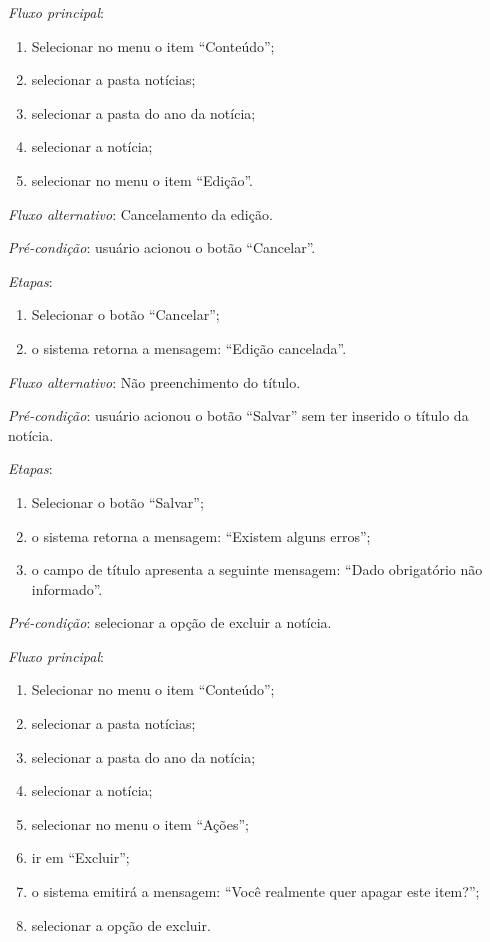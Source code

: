 \noindent \textit{Fluxo principal}:

\begin{enumerate}
    \item Selecionar no menu o item ``Conteúdo'';
    \item selecionar a pasta notícias;
    \item selecionar a pasta do ano da notícia;
    \item selecionar a notícia;
    \item selecionar no menu o item ``Edição''.
\end{enumerate}

\noindent \textit{Fluxo alternativo}: Cancelamento da edição.

\noindent \textit{Pré-condição}: usuário acionou o botão ``Cancelar''.

\noindent \textit{Etapas}:

\begin{enumerate}
    \item Selecionar o botão ``Cancelar'';
    \item o sistema retorna a mensagem: ``Edição cancelada''.
\end{enumerate}

\noindent \textit{Fluxo alternativo}: Não preenchimento do título.

\noindent \textit{Pré-condição}: usuário acionou o botão ``Salvar'' sem ter inserido o título da notícia.

\noindent \textit{Etapas}:

\begin{enumerate}
    \item Selecionar o botão ``Salvar'';
    \item o sistema retorna a mensagem: ``Existem alguns erros'';
    \item o campo de título apresenta a seguinte mensagem: ``Dado obrigatório não informado''.
\end{enumerate}




\vspace{0.7cm}

\noindent \textit{Pré-condição}: selecionar a opção de excluir a notícia.

\noindent \textit{Fluxo principal}:

\begin{enumerate}
    \item Selecionar no menu o item ``Conteúdo'';
    \item selecionar a pasta notícias;
    \item selecionar a pasta do ano da notícia;
    \item selecionar a notícia;
    \item selecionar no menu o item ``Ações'';
    \item ir em ``Excluir'';
    \item o sistema emitirá a mensagem: ``Você realmente quer apagar este item?'';
    \item selecionar a opção de excluir.
\end{enumerate}

